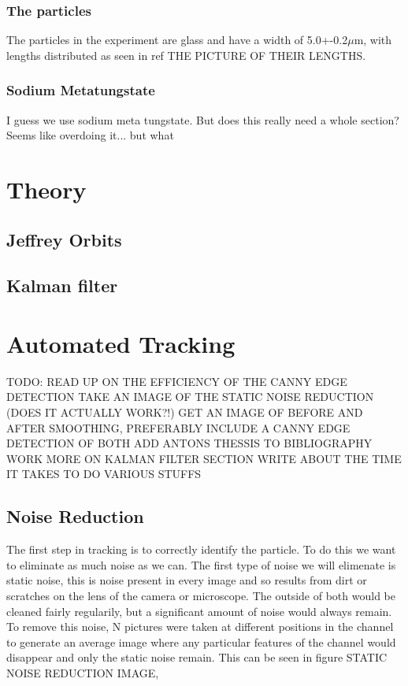 \documentclass[]{report}
\begin{document}
\subsection{The particles}
The particles in the experiment are glass and have a width of 5.0+-0.2$\mu$m, with lengths distributed as seen in ref THE PICTURE OF THEIR LENGTHS.  

\subsection{Sodium Metatungstate}
I guess we use sodium meta tungstate. But does this really need a whole section? Seems like overdoing it... but what %

\chapter{Theory}

\section{Jeffrey Orbits}

\section{Kalman filter}
\chapter{Automated Tracking}
TODO:
READ UP ON THE EFFICIENCY OF THE CANNY EDGE DETECTION
TAKE AN IMAGE OF THE STATIC NOISE REDUCTION (DOES IT ACTUALLY WORK?!)
GET AN IMAGE OF BEFORE AND AFTER SMOOTHING, PREFERABLY INCLUDE A CANNY EDGE DETECTION OF BOTH 
ADD ANTONS THESSIS TO BIBLIOGRAPHY
WORK MORE ON KALMAN FILTER SECTION
WRITE ABOUT THE TIME IT TAKES TO DO VARIOUS STUFFS

\section{Noise Reduction}
The first step in tracking is to correctly identify the particle. To do this we want to eliminate as much noise as we can. The first type of noise we will elimenate is static noise, this is noise present in every image and so results from dirt or scratches on the lens of the camera or microscope. The outside of both would be cleaned fairly regularily, but a significant amount of noise would always remain. To remove this noise, N pictures were taken at different positions in the channel to generate an average image where any particular features of the channel would disappear and only the static noise remain. This can be seen in figure STATIC NOISE REDUCTION IMAGE,
\end{document}
